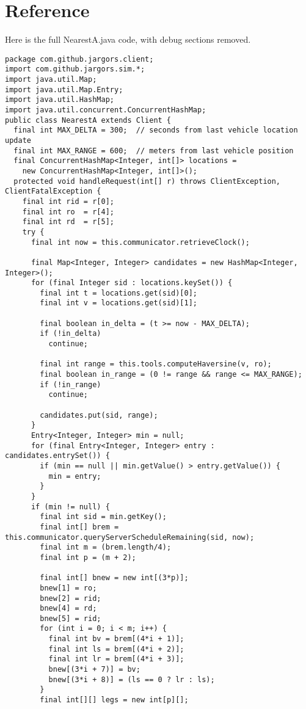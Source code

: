 \section{Reference}

Here is the full NearestA.java code, with debug sections removed.

{
\small
\begin{verbatim}
package com.github.jargors.client;
import com.github.jargors.sim.*;
import java.util.Map;
import java.util.Map.Entry;
import java.util.HashMap;
import java.util.concurrent.ConcurrentHashMap;
public class NearestA extends Client {
  final int MAX_DELTA = 300;  // seconds from last vehicle location update
  final int MAX_RANGE = 600;  // meters from last vehicle position
  final ConcurrentHashMap<Integer, int[]> locations =
    new ConcurrentHashMap<Integer, int[]>();
  protected void handleRequest(int[] r) throws ClientException, ClientFatalException {
    final int rid = r[0];
    final int ro  = r[4];
    final int rd  = r[5];
    try {
      final int now = this.communicator.retrieveClock();

      final Map<Integer, Integer> candidates = new HashMap<Integer, Integer>();
      for (final Integer sid : locations.keySet()) {
        final int t = locations.get(sid)[0];
        final int v = locations.get(sid)[1];

        final boolean in_delta = (t >= now - MAX_DELTA);
        if (!in_delta)
          continue;

        final int range = this.tools.computeHaversine(v, ro);
        final boolean in_range = (0 != range && range <= MAX_RANGE);
        if (!in_range)
          continue;

        candidates.put(sid, range);
      }
      Entry<Integer, Integer> min = null;
      for (final Entry<Integer, Integer> entry : candidates.entrySet()) {
        if (min == null || min.getValue() > entry.getValue()) {
          min = entry;
        }
      }
      if (min != null) {
        final int sid = min.getKey();
        final int[] brem = this.communicator.queryServerScheduleRemaining(sid, now);
        final int m = (brem.length/4);
        final int p = (m + 2);

        final int[] bnew = new int[(3*p)];
        bnew[1] = ro;
        bnew[2] = rid;
        bnew[4] = rd;
        bnew[5] = rid;
        for (int i = 0; i < m; i++) {
          final int bv = brem[(4*i + 1)];
          final int ls = brem[(4*i + 2)];
          final int lr = brem[(4*i + 3)];
          bnew[(3*i + 7)] = bv;
          bnew[(3*i + 8)] = (ls == 0 ? lr : ls);
        }
        final int[][] legs = new int[p][];


\end{verbatim}}
